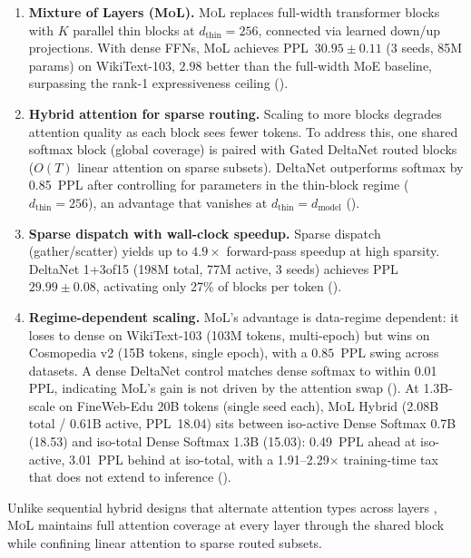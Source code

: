 \documentclass[10pt]{article}
\newcommand{\mol}{\textsc{MoL}}
\newcommand{\dmodel}{d_\text{model}}
\newcommand{\dthin}{d_\text{thin}}
\begin{document}
\begin{enumerate}[nosep,leftmargin=*]
\item \textbf{Mixture of Layers (\mol{}).}
\mol{} replaces full-width transformer blocks with $K$ parallel thin blocks at $\dthin{=}256$, connected via learned down/up projections.
With dense FFNs, MoL achieves PPL~$30.95 \pm 0.11$ (3 seeds, 85M params) on WikiText-103, $2.98$ better than the full-width MoE baseline, surpassing the rank-1 expressiveness ceiling ().

\item \textbf{Hybrid attention for sparse routing.}
Scaling to more blocks degrades attention quality as each block sees fewer tokens.
To address this, one shared softmax block (global coverage) is paired with Gated DeltaNet \citep{yang2024gated} routed blocks ($O(T)$ linear attention on sparse subsets).
DeltaNet outperforms softmax by 0.85~PPL after controlling for parameters in the thin-block regime ($\dthin{=}256$), an advantage that vanishes at $\dthin{=}\dmodel$ ().

\item \textbf{Sparse dispatch with wall-clock speedup.}
Sparse dispatch (gather/scatter) yields up to $4.9\times$ forward-pass speedup at high sparsity.
DeltaNet 1+3of15 (198M total, 77M active, 3 seeds) achieves PPL~$29.99 \pm 0.08$, activating only 27\% of blocks per token ().

\item \textbf{Regime-dependent scaling.}
MoL's advantage is data-regime dependent: it loses to dense on WikiText-103 (103M tokens, multi-epoch) but wins on Cosmopedia v2 (15B tokens, single epoch), with a $0.85$~PPL swing across datasets.
A dense DeltaNet control matches dense softmax to within 0.01 PPL, indicating MoL's gain is not driven by the attention swap ().
At 1.3B-scale on FineWeb-Edu 20B tokens (single seed each), \mol{} Hybrid (2.08B total / 0.61B active, PPL~18.04) sits between iso-active Dense Softmax 0.7B (18.53) and iso-total Dense Softmax 1.3B (15.03): 0.49~PPL ahead at iso-active, 3.01~PPL behind at iso-total, with a 1.91--2.29$\times$ training-time tax that does not extend to inference ().
\end{enumerate}

Unlike sequential hybrid designs that alternate attention types across layers \citep{qwen3next_2025, glorioso2024zamba}, \mol{} maintains full attention coverage at every layer through the shared block while confining linear attention to sparse routed subsets.
\end{document}
